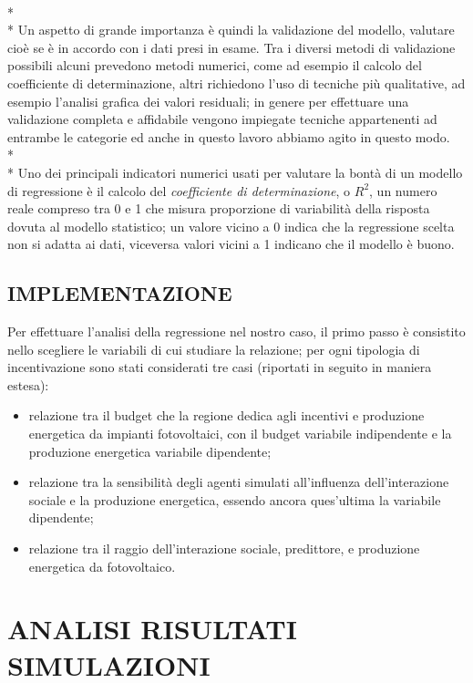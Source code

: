 \documentclass[12pt,a4paper,openright,twoside]{report}
\begin{document}
\\*\\*
Un aspetto di grande importanza è quindi la validazione del modello, valutare cioè se è in accordo con i dati presi in esame. Tra i diversi metodi di validazione possibili alcuni prevedono metodi numerici, come ad esempio il calcolo del coefficiente di determinazione, altri richiedono l'uso di tecniche più qualitative, ad esempio l'analisi grafica dei valori residuali; in genere per effettuare una validazione completa e affidabile vengono impiegate tecniche appartenenti ad entrambe le categorie ed anche in questo lavoro abbiamo agito in questo modo.\\*\\*
Uno dei principali indicatori numerici usati per valutare la bontà di un modello di regressione è il calcolo del \emph{coefficiente di determinazione}, o $R^2$, un numero reale compreso tra 0 e 1 che misura proporzione di variabilità della risposta dovuta al modello statistico; un valore vicino a 0 indica che la regressione scelta non si adatta ai dati, viceversa valori vicini a 1 indicano che il modello è buono.

\subsection{IMPLEMENTAZIONE}

Per effettuare l'analisi della regressione nel nostro caso, il primo passo è consistito nello scegliere le variabili di cui studiare la relazione; per ogni tipologia di incentivazione sono stati considerati tre casi (riportati in seguito in maniera estesa):
\begin{itemize}
\item relazione tra il budget che la regione dedica agli incentivi e produzione energetica da impianti fotovoltaici, con il budget variabile indipendente e la produzione energetica variabile dipendente;
\item relazione tra la sensibilità degli agenti simulati all'influenza dell'interazione sociale e la produzione energetica, essendo ancora ques'ultima la variabile dipendente;
\item relazione tra il raggio dell'interazione sociale, predittore, e produzione energetica da fotovoltaico.
\end{itemize}

\section[ANALISI RISULTATI]{ANALISI RISULTATI SIMULAZIONI}
\end{document}
